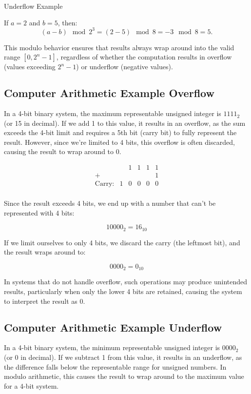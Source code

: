 Underflow Example

If \( a = 2 \) and \( b = 5 \), then:
\[
(a - b) \mod 2^3 = (2 - 5) \mod 8 = -3 \mod 8 = 5.
\]

\vspace{\baselineskip}\par
This modulo behavior ensures that results always wrap around into the valid range \( [0, 2^n - 1] \), regardless of whether the computation results in overflow (values exceeding \( 2^n - 1 \)) or underflow (negative values).

\subsection{Computer Arithmetic Example Overflow} \label{subsub:overflow_example}
In a 4-bit binary system, the maximum representable unsigned integer is \( 1111_2 \) (or 15 in decimal). If we add 1 to this value, it results in an overflow, as the sum exceeds the 4-bit limit and requires a 5th bit (carry bit) to fully represent the result. However, since we’re limited to 4 bits, this overflow is often discarded, causing the result to wrap around to 0.

\[
\begin{array}{rccccc}
       & & 1 & 1 & 1 & 1 \\ %
    +  & &   &   &   & 1 \\ %
    \hline
\text{Carry:} & 1 & 0 & 0 & 0 & 0 \\ %
\end{array}
\]

Since the result exceeds 4 bits, we end up with a number that can't be represented with 4 bits:

\[
10000_2 = 16_{10}
\]

If we limit ourselves to only 4 bits, we discard the carry (the leftmost bit), and the result wraps around to:

\[
0000_2 = 0_{10}
\]

In systems that do not handle overflow, such operations may produce unintended results, particularly when only the lower 4 bits are retained, causing the system to interpret the result as 0.

\subsection{Computer Arithmetic Example Underflow} \label{subsub:underflow_example}
In a 4-bit binary system, the minimum representable unsigned integer is \( 0000_2 \) (or 0 in decimal). If we subtract 1 from this value, it results in an underflow, as the difference falls below the representable range for unsigned numbers. In modulo arithmetic, this causes the result to wrap around to the maximum value for a 4-bit system.

